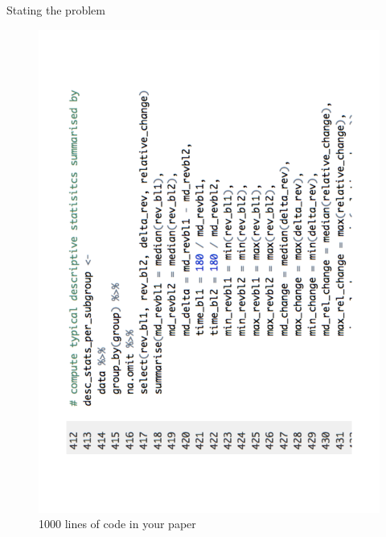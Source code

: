 \documentclass[final,hyperref={pdfpagelabels=false}]{beamer}
\begin{document}
\begin{frame}{}
\begin{columns}[t]
\begin{column}{.48\linewidth}
      
         \begin{block}{Stating the problem}
         \begin{minipage}[t]{0.40\textwidth}
         \begin{figure}[ht]
             \centering
             \includegraphics[valign=T,scale=.4, angle=270]{logo/rcode_example}
             \caption{ 1000 lines of code in your paper} 
          \end{figure}
          \end{minipage}
          \begin{minipage}[t]{0.55\textwidth}
          \begin{figure}[ht]
             \centering

\end{figure}
\end{minipage}
\end{block}
\end{column}
\end{columns}
\end{frame}
\end{document}
